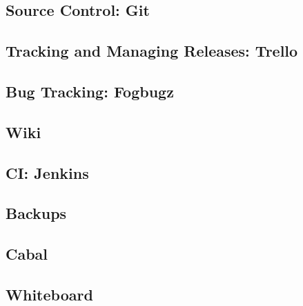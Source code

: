 \subsection{Source Control: Git}

\subsection{Tracking and Managing Releases: Trello}

\subsection{Bug Tracking: Fogbugz}

\subsection{Wiki}

\subsection{CI: Jenkins}

\subsection{Backups}

\subsection{Cabal}

\subsection{Whiteboard}
